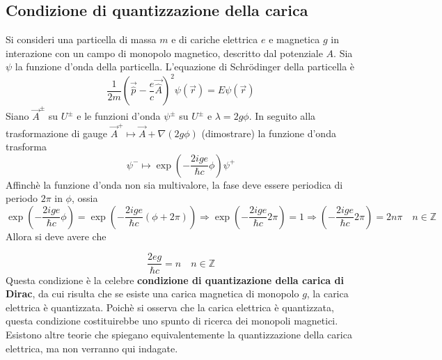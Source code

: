 \subsection{Condizione di quantizzazione della carica}
Si consideri una particella di massa $m$ e di cariche elettrica $e$ e magnetica
$g$ in interazione con un campo di monopolo magnetico, descritto dal potenziale
$A$. Sia $\psi$ la funzione d'onda della particella. L'equazione di Schrödinger
della particella è
\begin{equation}
   \frac{1}{2m}\left( \vec{\hat{p}} - \frac{e}{c} \vec{\hat{A}} \right)^2 \psi(\vec r) = E\psi(\vec r)
\end{equation}
Siano $\vec A^\pm$ su $U^\pm$ e le funzioni d'onda $\psi^\pm$ su $U^\pm$ e $\lambda =2g\phi$.
In seguito alla trasformazione di gauge $ \vec A^+ \mapsto \vec A + \nabla (2g\phi)$ (dimostrare)
la funzione d'onda trasforma
$$ \psi^- \mapsto \exp \left( - \frac{2ige}{\hbar c} \phi \right) \psi^+$$
Affinchè la funzione d'onda non sia multivalore, la fase deve essere periodica di
periodo $2\pi$ in $\phi$, ossia
$$
   \exp \left( - \frac{2ige}{\hbar c} \phi \right)
      = \exp \left( - \frac{2ige}{\hbar c} (\phi + 2\pi) \right)
   \Rightarrow
   \exp \left( - \frac{2ige}{\hbar c} 2\pi \right) = 1
   \Rightarrow
   \left( - \frac{2ige}{\hbar c} 2\pi \right) = 2n\pi \quad n \in \mathbb{Z}
$$
Allora si deve avere che

\begin{equation}\label{eq:diracquantumcharge}
   \boxed{
      \frac{2eg}{\hbar c} = n \quad  n \in \mathbb{Z}
   }
\end{equation}
Questa condizione è la celebre \textbf{condizione di quantizazione della carica
di Dirac}, da cui risulta che se esiste una carica magnetica di monopolo $g$,
la carica elettrica è quantizzata. Poichè si osserva che la carica elettrica è
quantizzata, questa condizione costituirebbe uno spunto di ricerca dei monopoli
magnetici.\\
Esistono altre teorie che spiegano equivalentemente la quantizzazione della carica
elettrica, ma non verranno qui indagate.\\
